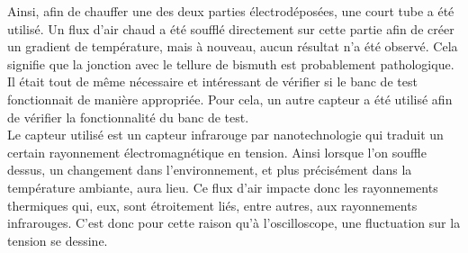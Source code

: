 Ainsi, afin de chauffer une des deux parties électrodéposées, une court tube a été utilisé. Un flux d'air chaud a été soufflé directement sur cette
partie afin de créer un gradient de température, mais à nouveau, aucun résultat n'a été observé. Cela signifie que la jonction avec le tellure
de bismuth est probablement pathologique.\\

Il était tout de même nécessaire et intéressant de vérifier si le banc de test fonctionnait de manière appropriée. Pour cela, un autre capteur
a été utilisé afin de vérifier la fonctionnalité du banc de test. \\
Le capteur utilisé est un capteur infrarouge par nanotechnologie qui traduit un certain rayonnement électromagnétique en tension. Ainsi lorsque l'on souffle
dessus, un changement dans l'environnement, et plus précisément dans la température ambiante, aura lieu. Ce flux d'air impacte donc
les rayonnements thermiques qui, eux, sont étroitement liés, entre autres, aux rayonnements infrarouges. C'est donc pour cette raison qu'à
l'oscilloscope, une fluctuation sur la tension se dessine.
